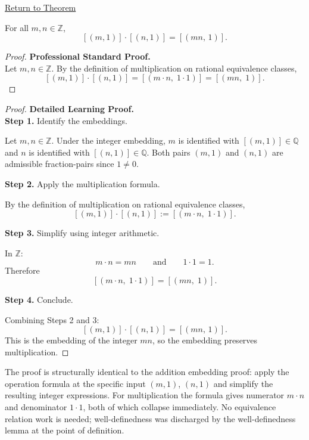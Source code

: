 \newpage
{}
\label{prf:ec-integer-embedding-mul}

\begin{remark*}[Return]
\hyperref[thm:ec-integer-embedding-mul]{Return to Theorem}
\end{remark*}

\begin{theorem*}
For all $m,n\in\mathbb{Z}$,
\[
[(m,1)] \cdot [(n,1)] = [(mn,\,1)].
\]
\end{theorem*}

\begin{proof}
\textbf{Professional Standard Proof.}~\\
Let $m,n\in\mathbb{Z}$.  By the definition of multiplication on rational
equivalence classes,
\[
[(m,1)] \cdot [(n,1)]
= [(m\cdot n,\; 1\cdot 1)]
= [(mn,\; 1)].
\]
\end{proof}

\begin{proof}
\textbf{Detailed Learning Proof.}~\\

\textbf{Step 1.} Identify the embeddings.

Let $m,n\in\mathbb{Z}$.  Under the integer embedding, $m$ is identified
with $[(m,1)]\in\mathbb{Q}$ and $n$ is identified with $[(n,1)]\in\mathbb{Q}$.
Both pairs $(m,1)$ and $(n,1)$ are admissible fraction-pairs since $1\neq 0$.

\textbf{Step 2.} Apply the multiplication formula.

By the definition of multiplication on rational equivalence classes,
\[
[(m,1)] \cdot [(n,1)]
:= [(m\cdot n,\; 1\cdot 1)].
\]

\textbf{Step 3.} Simplify using integer arithmetic.

In $\mathbb{Z}$:
\[
m\cdot n = mn
\qquad\text{and}\qquad
1\cdot 1 = 1.
\]
Therefore
\[
[(m\cdot n,\; 1\cdot 1)] = [(mn,\; 1)].
\]

\textbf{Step 4.} Conclude.

Combining Steps 2 and 3:
\[
[(m,1)] \cdot [(n,1)] = [(mn,\,1)].
\]
This is the embedding of the integer $mn$, so the embedding preserves
multiplication.
\end{proof}

\begin{remark*}
The proof is structurally identical to the addition embedding proof: apply
the operation formula at the specific input $(m,1)$, $(n,1)$ and simplify
the resulting integer expressions.  For multiplication the formula gives
numerator $m\cdot n$ and denominator $1\cdot 1$, both of which collapse
immediately.  No equivalence relation work is needed; well-definedness was
discharged by the well-definedness lemma at the point of definition.
\end{remark*}


